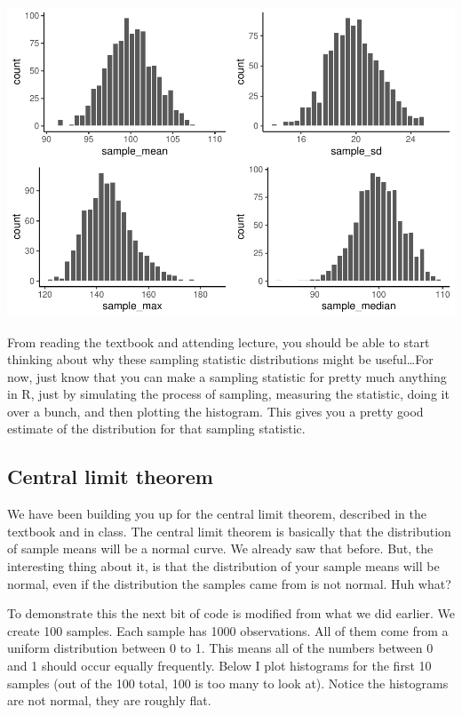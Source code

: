 \documentclass[]{book}
\begin{document}
\includegraphics{Statistics_Lab_files/figure-latex/unnamed-chunk-121-1.pdf}

From reading the textbook and attending lecture, you should be able to
start thinking about why these sampling statistic distributions might be
useful\ldots{}For now, just know that you can make a sampling statistic
for pretty much anything in R, just by simulating the process of
sampling, measuring the statistic, doing it over a bunch, and then
plotting the histogram. This gives you a pretty good estimate of the
distribution for that sampling statistic.

\subsection{Central limit theorem}\label{central-limit-theorem}

We have been building you up for the central limit theorem, described in
the textbook and in class. The central limit theorem is basically that
the distribution of sample means will be a normal curve. We already saw
that before. But, the interesting thing about it, is that the
distribution of your sample means will be normal, even if the
distribution the samples came from is not normal. Huh what?

To demonstrate this the next bit of code is modified from what we did
earlier. We create 100 samples. Each sample has 1000 observations. All
of them come from a uniform distribution between 0 to 1. This means all
of the numbers between 0 and 1 should occur equally frequently. Below I
plot histograms for the first 10 samples (out of the 100 total, 100 is
too many to look at). Notice the histograms are not normal, they are
roughly flat.
\end{document}
